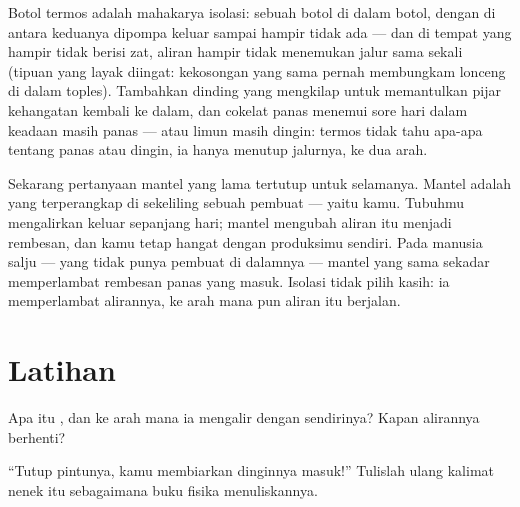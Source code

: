 \begin{example}[Termos]\label{ex:g5:heat-and-insulation:thermos}
Botol termos adalah mahakarya isolasi: sebuah botol di dalam botol,
dengan  di antara keduanya dipompa keluar sampai hampir tidak ada
--- dan di tempat yang hampir tidak berisi zat, aliran  hampir
tidak menemukan jalur sama sekali (tipuan yang layak diingat:
kekosongan yang sama pernah membungkam lonceng di dalam toples).
Tambahkan dinding yang mengkilap untuk memantulkan pijar kehangatan
kembali ke dalam, dan cokelat panas menemui sore hari dalam keadaan
masih panas --- atau limun masih dingin: termos tidak tahu apa-apa
tentang panas atau dingin, ia hanya menutup jalurnya, ke dua arah.
\end{example}

\begin{remark}\label{rem:g5:heat-and-insulation:coat}
Sekarang pertanyaan mantel yang lama tertutup untuk selamanya. Mantel
adalah  yang terperangkap di sekeliling sebuah pembuat  ---
yaitu kamu. Tubuhmu mengalirkan  keluar sepanjang hari; mantel
mengubah aliran itu menjadi rembesan, dan kamu tetap hangat dengan
produksimu sendiri. Pada manusia salju --- yang tidak punya pembuat
 di dalamnya --- mantel yang sama sekadar memperlambat rembesan
 panas yang masuk. Isolasi tidak pilih kasih: ia memperlambat
alirannya, ke arah mana pun aliran itu berjalan.
\end{remark}

\section{Latihan}

\begin{exercise}[$\star$]\label{exo:g5:heat-and-insulation:1}
Apa itu , dan ke arah mana ia mengalir dengan sendirinya? Kapan
alirannya berhenti?
\end{exercise}

\begin{exercise}[$\star$]\label{exo:g5:heat-and-insulation:2}
``Tutup pintunya, kamu membiarkan dinginnya masuk!'' Tulislah ulang
kalimat nenek itu sebagaimana buku fisika menuliskannya.
\end{exercise}

